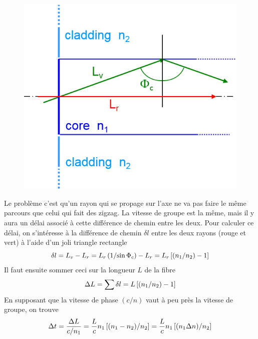 \begin{figure}
	\vspace{-5mm}
	\includegraphics[scale=0.34]{ch1/image5.png}
	\end{figure}
Le problème c'est qu'un rayon qui se propage sur l'axe ne va pas faire le même parcours que 
celui qui fait des zigzag. La vitesse de groupe est la même, mais il y aura un délai associé 
à cette différence de chemin entre les deux. Pour calculer ce délai, on s'intéresse à la différence
de chemin $\delta l$ entre les deux rayons (rouge et vert) à l'aide d'un joli triangle rectangle
\begin{equation}
\delta l = {L_v} - {L_r} = {L_r}\left( {{1 \mathord{\left/
 {\vphantom {1 {\sin {\Phi _c}}}} \right.
 \kern-\nulldelimiterspace} {\sin {\Phi _c}}}} \right) - {L_r} = {L_r}\left[ {\left( {{{{n_1}} \mathord{\left/
 {\vphantom {{{n_1}} {{n_2}}}} \right.
 \kern-\nulldelimiterspace} {{n_2}}}} \right) - 1} \right]
\end{equation}
Il faut ensuite sommer ceci sur la longueur $L$ de la fibre 
\begin{equation}
\Delta L = \sum {\delta l}  = L\left[ {\left( {{{{n_1}} \mathord{\left/
{\vphantom {{{n_1}} {{n_2}}}} \right.
\kern-\nulldelimiterspace} {{n_2}}}} \right) - 1} \right]
\end{equation}
En supposant que la vitesse de phase $(c/n)$ vaut à peu près la vitesse de groupe, on trouve
\begin{equation}
\Delta t = \frac{{\Delta L}}{{{c \mathord{\left/
 {\vphantom {c {{n_1}}}} \right.
 \kern-\nulldelimiterspace} {{n_1}}}}} = \frac{L}{c}{n_1}\left[ {{{\left( {{n_1} - {n_2}} \right)} \mathord{\left/
 {\vphantom {{\left( {{n_1} - {n_2}} \right)} {{n_2}}}} \right.
 \kern-\nulldelimiterspace} {{n_2}}}} \right] = \frac{L}{c}{n_1}\left[ {{{\left( {{n_1}\Delta n} \right)} \mathord{\left/
 {\vphantom {{\left( {{n_1}\Delta n} \right)} {{n_2}}}} \right.
 \kern-\nulldelimiterspace} {{n_2}}}} \right]
\end{equation}
